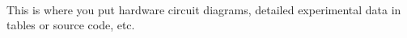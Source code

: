  \\

This is where you put hardware circuit diagrams, detailed experimental data in tables or source code, etc.
